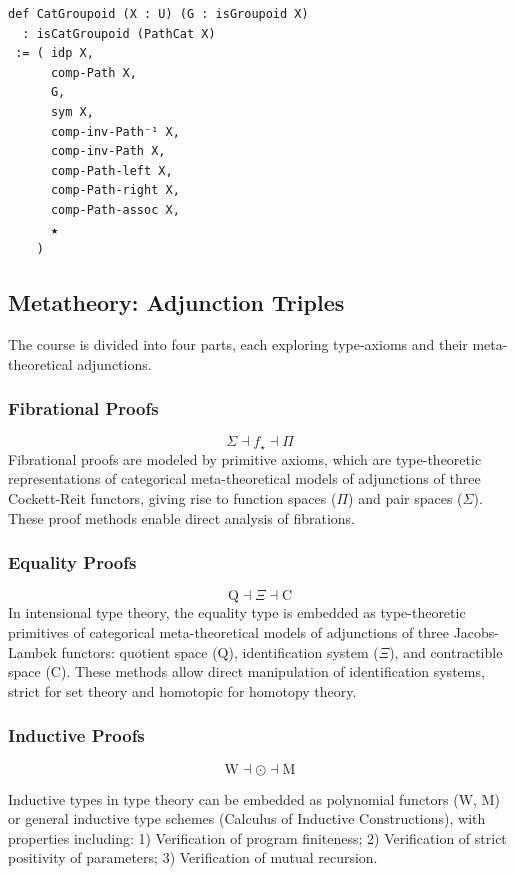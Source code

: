 \documentclass{article}
\theoremstyle{definition}
\begin{document}
\begin{lstlisting}
def CatGroupoid (X : U) (G : isGroupoid X)
  : isCatGroupoid (PathCat X)
 := ( idp X,
      comp-Path X,
      G,
      sym X,
      comp-inv-Path⁻¹ X,
      comp-inv-Path X,
      comp-Path-left X,
      comp-Path-right X,
      comp-Path-assoc X,
      ★
    )
\end{lstlisting}

\newpage
\subsection{Metatheory: Adjunction Triples}
The course is divided into four parts, each exploring type-axioms and their meta-theoretical adjunctions.

\subsubsection{Fibrational Proofs}
\[
\Sigma \dashv f_\star \dashv \Pi
\]
Fibrational proofs are modeled by primitive axioms, which are type-theoretic
representations of categorical meta-theoretical models of adjunctions of three
Cockett-Reit functors, giving rise to function spaces (\(\Pi\)) and pair
spaces (\(\Sigma\)). These proof methods enable direct analysis of fibrations.

\subsubsection{Equality Proofs}
\[
\mathrm{Q} \dashv \Xi \dashv \mathrm{C}
\]
In intensional type theory, the equality type is embedded as type-theoretic
primitives of categorical meta-theoretical models of adjunctions of three
Jacobs-Lambek functors: quotient space (\(\mathrm{Q}\)), identification
system (\(\Xi\)), and contractible space (\(\mathrm{C}\)). These methods allow
direct manipulation of identification systems, strict for set theory and
homotopic for homotopy theory.

\subsubsection{Inductive Proofs}
$$
\mathrm{W} \dashv \odot \dashv \mathrm{M}
$$

Inductive types in type theory can be embedded as polynomial
functors ($\mathrm{W}$, $\mathrm{M}$) or general inductive type
schemes (Calculus of Inductive Constructions), with properties including:
1) Verification of program finiteness;
2) Verification of strict positivity of parameters;
3) Verification of mutual recursion.
\end{document}

